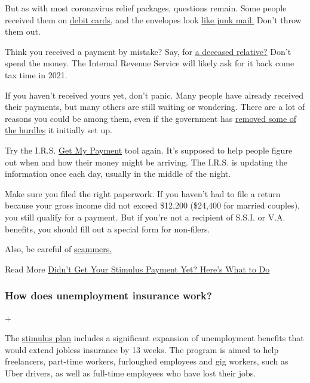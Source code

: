 But as with most coronavirus relief packages, questions remain. Some
people received them on
\href{https://www.washingtonpost.com/business/2020/06/01/faq-stimulus-debit-card/}{debit
cards,} and the envelopes look
\href{https://twitter.com/zackstanton/status/1263908922899009536}{like
junk mail.} Don't throw them out.

Think you received a payment by mistake? Say, for
\href{https://www.nytimes3xbfgragh.onion/2020/06/25/us/politics/coronavirus-stimulus-dead-people.html}{a
deceased relative?} Don't spend the money. The Internal Revenue Service
will likely ask for it back come tax time in 2021.

If you haven't received yours yet, don't panic. Many people have already
received their payments, but many others are still waiting or wondering.
There are a lot of reasons you could be among them, even if the
government has
\href{https://www.nytimes3xbfgragh.onion/2020/04/01/business/coronavirus-stimulus-social-security.html}{removed
some of the hurdles} it initially set up.

Try the I.R.S. \href{https://www.irs.gov/coronavirus/get-my-payment}{Get
My Payment} tool again. It's supposed to help people figure out when and
how their money might be arriving. The I.R.S. is updating the
information once each day, usually in the middle of the night.

Make sure you filed the right paperwork. If you haven't had to file a
return because your gross income did not exceed \$12,200 (\$24,400 for
married couples), you still qualify for a payment. But if you're not a
recipient of S.S.I. or V.A. benefits, you should fill out a special form
for non-filers.

Also, be careful of
\href{https://www.nytimes3xbfgragh.onion/2020/04/22/technology/stimulus-checks-hackers-coronavirus.html}{scammers.}

 Read More
\href{https://www.nytimes3xbfgragh.onion/article/where-is-my-stimulus-payment.html}{Didn't
Get Your Stimulus Payment Yet? Here's What to Do}

\hypertarget{how-does-unemployment-insurance-work}{%
\subsubsection{How does unemployment insurance
work?}\label{how-does-unemployment-insurance-work}}

+

The
\href{https://www.nytimes3xbfgragh.onion/2020/03/25/us/politics/whats-in-coronavirus-stimulus-bill.html}{stimulus
plan} includes a significant expansion of unemployment benefits that
would extend jobless insurance by 13 weeks. The program is aimed to help
freelancers, part-time workers, furloughed employees and gig workers,
such as Uber drivers, as well as full-time employees who have lost their
jobs.

